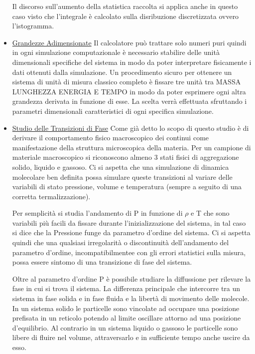 \documentclass[11pt]{article}
\theoremstyle{plain}
\theoremstyle{remark}
\begin{document}
\begin{itemize}
Il discorso sull'aumento della statistica raccolta si applica anche in questo caso visto che l'integrale è calcolato sulla disribuzione discretizzata ovvero l'istogramma.


\item \underline{Grandezze Adimensionate}\newline
Il calcolatore può trattare solo numeri puri quindi in ogni simulazione computazionale è necessario stabilire delle unità dimensionali specifiche del sistema in modo da poter interpretare fisicamente i dati ottenuti dalla simulazione.
Un procedimento sicuro per ottenere un sistema di unità di misura classico completo è fissare tre unità tra MASSA LUNGHEZZA ENERGIA E TEMPO in modo da poter esprimere ogni altra grandezza derivata in funzione di esse.
La scelta verrà effettuata sfruttando i parametri dimensionali caratteristici di ogni specifica simulazione.


\item \underline{Studio delle Transizioni di Fase}\newline
Come già detto lo scopo di questo studio è di derivare il comportamento fisico macroscopico dei continui come manifestazione della struttura microscopica della materia.
Per un campione di materiale macroscopico si riconoscono almeno 3 stati fisici di aggregazione solido, liquido  e gassoso.
Ci si aspetta che una simulazione di dinamica molecolare ben definita possa simulare queste transizioni al variare delle variabili di stato pressione, volume e temperatura (sempre a seguito di una corretta termalizzazione).

Per semplicità si studia l'andamento di P in funzione di $\rho$ e T che sono variabili più facili da fissare durante l'inizializzazione del sistema, in tal caso si dice che la Pressione funge da parametro d'ordine del sistema.
Ci si aspetta quindi che una qualsiasi irregolarità o discontinuità dell'andamento del parametro d'ordine, incompatibilmentee con gli errori statistici sulla misura, possa essere sintomo di una transizione di fase del sistema.

Oltre al parametro d'ordine P è possibile studiare la diffussione per rilevare la fase in cui si trova il sistema.
La differenza principale che intercorre tra un sistema in fase solida e in fase fluida e la libertà di movimento delle molecole.
In un sistema solido  le particelle sono vincolate ad occupare una posizione prefisata in un reticolo potendo al limite oscillare attorno ad una posizione d'equilibrio.
Al contrario in un sistema liquido o gassoso le particelle sono libere di fluire nel volume, attraversarlo e in sufficiente tempo anche uscire da esso.


\end{itemize}
\end{document}
